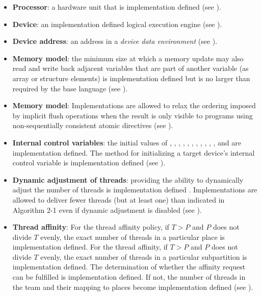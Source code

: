 \begin{itemize}
\item \textbf{Processor}: a hardware unit that is implementation defined (see 
). 

\item \textbf{Device}: an implementation defined logical execution engine (see 
). 

\item \textbf{Device address}: an address in a \emph{device data environment} (see ).

\item \textbf{Memory model}: the minimum size at which a memory update may also read and 
write back adjacent variables that are part of another variable (as array or structure 
elements) is implementation defined but is no larger than required by the base 
language (see ).

\item \textbf{Memory model}: Implementations are allowed to relax the ordering imposed by
implicit flush operations when the result is only visible to programs using 
non-sequentially consistent atomic directives (see ). 

\item \textbf{Internal control variables}: the initial values of 
, , , , 
, , , 
, , 
, , and 
 are implementation defined.  The method for
initializing a target device's internal control variable is
implementation defined (see ).

\item \textbf{Dynamic adjustment of threads}: providing the ability to dynamically adjust the 
number of threads is implementation defined . Implementations are allowed to deliver 
fewer threads (but at least one) than indicated in Algorithm 2-1 even if dynamic 
adjustment is disabled (see ).

\item \textbf{Thread affinity}: For the  thread affinity
  policy, if $T > P$ and $P$ does not divide $T$ evenly, the exact
  number of threads in a particular place is implementation defined.
  For the  thread affinity, if $T > P$ and $P$ does not
  divide $T$ evenly, the exact number of threads in a particular
  subpartition is implementation defined.  The determination of
  whether the affinity request can be fulfilled is implementation
  defined.  If not, the number of threads in the team and their mapping
  to places become implementation defined (see
  ).


\end{itemize}
